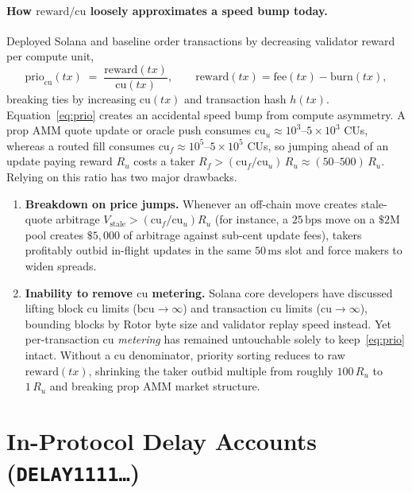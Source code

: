 \documentclass[10pt,a4paper]{article}
\newcommand{\DelayAcct}{\texttt{DELAY1111\allowbreak\dots}}
\newcommand{\NewCon}{\text{NewCon}}
\begin{document}
\paragraph{How $\mathrm{reward}/\mathrm{cu}$ loosely approximates a speed bump today.}
Deployed Solana and baseline \NewCon{} order transactions by decreasing validator reward per compute unit,
\begin{equation}
  \mathrm{prio}_{\mathrm{cu}}(\mathit{tx}) \;=\; \frac{\mathrm{reward}(\mathit{tx})}{\mathrm{cu}(\mathit{tx})},
  \qquad \mathrm{reward}(\mathit{tx}) = \mathrm{fee}(\mathit{tx}) - \mathrm{burn}(\mathit{tx}),
  \label{eq:prio}
\end{equation}
breaking ties by increasing $\mathrm{cu}(\mathit{tx})$ and transaction hash $h(\mathit{tx})$. Equation~\eqref{eq:prio} creates an accidental speed bump from compute asymmetry. A prop AMM quote update or oracle push consumes $\mathrm{cu}_u \approx 10^3\text{--}5\times 10^3$ CUs, whereas a routed fill consumes $\mathrm{cu}_f \approx 10^5\text{--}5\times 10^5$ CUs, so jumping ahead of an update paying reward $R_u$ costs a taker $R_f > (\mathrm{cu}_f/\mathrm{cu}_u)\, R_u \approx (50\text{--}500)\, R_u$. Relying on this ratio has two major drawbacks.
\begin{enumerate}[nosep,leftmargin=1.5em]
  \item \textbf{Breakdown on price jumps.} Whenever an off-chain move creates stale-quote arbitrage $V_{\text{stale}} > (\mathrm{cu}_f/\mathrm{cu}_u) R_u$ (for instance, a $25\,\text{bps}$ move on a $\$2\text{M}$ pool creates $\$5{,}000$ of arbitrage against sub-cent update fees), takers profitably outbid in-flight updates in the same $50\,\text{ms}$ slot and force makers to widen spreads.
  \item \textbf{Inability to remove $\mathrm{cu}$ metering.} Solana core developers have discussed lifting block $\mathrm{cu}$ limits ($\mathrm{bcu} \to \infty$) and transaction $\mathrm{cu}$ limits ($\mathrm{cu} \to \infty$), bounding blocks by Rotor byte size and validator replay speed instead. Yet per-transaction $\mathrm{cu}$ \emph{metering} has remained untouchable solely to keep~\eqref{eq:prio} intact. Without a $\mathrm{cu}$ denominator, priority sorting reduces to raw $\mathrm{reward}(\mathit{tx})$, shrinking the taker outbid multiple from roughly $100\,R_u$ to $1\,R_u$ and breaking prop AMM market structure.
\end{enumerate}

\section{In-Protocol Delay Accounts (\DelayAcct)}
\end{document}
